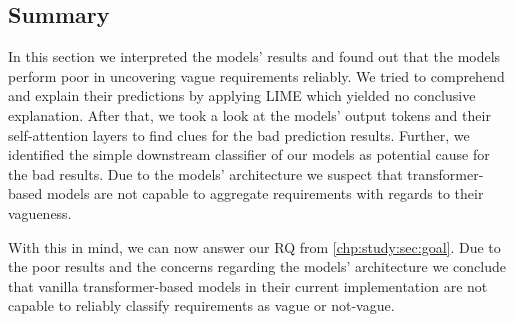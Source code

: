 \subsection{Summary}
\label{chp:study:sec:interpretation:subsec:summary}
In this section we interpreted the models' results and found out that the models perform poor in uncovering vague requirements reliably.
We tried to comprehend and explain their predictions by applying \ac{LIME} which yielded no conclusive explanation.
After that, we took a look at the models' output tokens and their self-attention layers to find clues for the bad prediction results.
Further, we identified the simple downstream classifier of our models as potential cause for the bad results.
Due to the models' architecture we suspect that transformer-based models are not capable to aggregate requirements with regards to their vagueness.

With this in mind, we can now answer our \ac{RQ} from \cref{chp:study:sec:goal}.
Due to the poor results and the concerns regarding the models' architecture we conclude that vanilla transformer-based models in their current implementation are not capable to reliably classify requirements as vague or not-vague.
